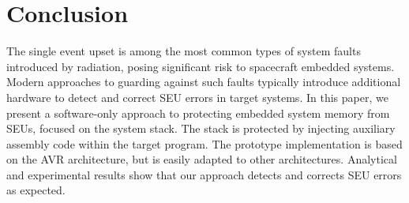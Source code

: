 \vspace{-15pt}
\section{Conclusion}\label{sec:conclusion}
\vspace{-10pt}
The single event upset is among the most common types of system faults introduced by radiation, posing significant risk to spacecraft embedded systems. Modern approaches to guarding against such faults typically introduce additional hardware to detect and correct SEU errors in target systems. In this paper, we present a software-only approach to protecting embedded system memory from SEUs, focused on the system stack. The stack is protected by injecting auxiliary assembly code within the target program. The prototype implementation is based on the AVR architecture, but is easily adapted to other architectures. Analytical and experimental results show that our approach detects and corrects SEU errors as expected. 

